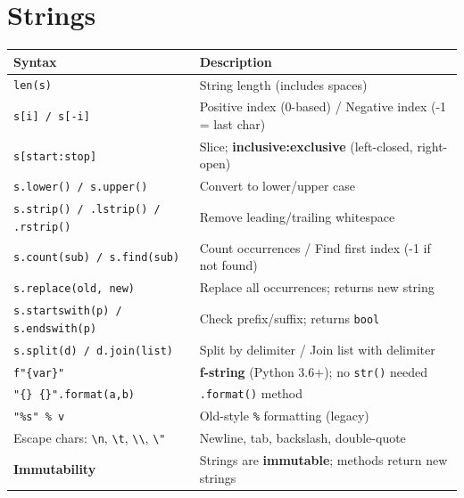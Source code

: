 \documentclass[11pt,a4paper]{report}
\let\oldtexttt\texttt
\renewcommand{\texttt}[1]{\textcolor{mainblue}{\oldtexttt{#1}}}
\begin{document}
\section*{Strings}
\small\renewcommand{\arraystretch}{1.3}
\centering
\begin{tabularx}{\textwidth}{@{}lX@{}}
\toprule
\textbf{Syntax} & \textbf{Description} \\ \midrule
\texttt{len(s)} & String length (includes spaces) \\
\texttt{s[i] / s[-i]} & Positive index (0-based) / Negative index (-1 = last char) \\
\texttt{s[start:stop]} & Slice; \textbf{inclusive:exclusive} (left-closed, right-open) \\
\texttt{s.lower() / s.upper()} & Convert to lower/upper case \\
\texttt{s.strip() / .lstrip() / .rstrip()} & Remove leading/trailing whitespace \\
\texttt{s.count(sub) / s.find(sub)} & Count occurrences / Find first index (-1 if not found) \\
\texttt{s.replace(old, new)} & Replace all occurrences; returns new string \\
\texttt{s.startswith(p) / s.endswith(p)} & Check prefix/suffix; returns \texttt{bool} \\
\texttt{s.split(d) / d.join(list)} & Split by delimiter / Join list with delimiter \\
\texttt{f"\{var\}"} & \textbf{f-string} (Python 3.6+); no \texttt{str()} needed \\
\texttt{"\{\} \{\}".format(a,b)} & \texttt{.format()} method \\
\texttt{"\%s" \% v} & Old-style \texttt{\%} formatting (legacy) \\
Escape chars: \texttt{\textbackslash n}, \texttt{\textbackslash t}, \texttt{\textbackslash\textbackslash}, \texttt{\textbackslash"} & Newline, tab, backslash, double-quote \\
\textbf{Immutability} & Strings are \textbf{immutable}; methods return new strings \\
\bottomrule
\end{tabularx}
\normalsize

\end{document}
